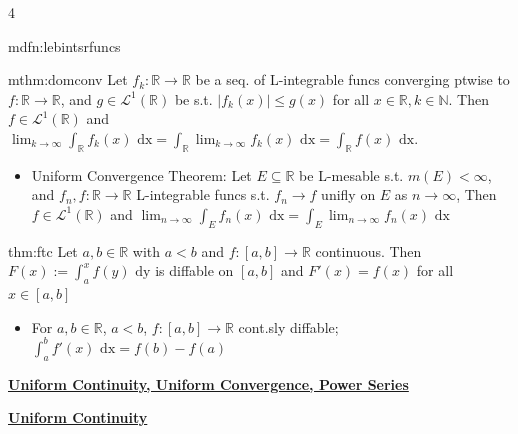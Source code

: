 \documentclass[landscape, 8pt]{extarticle}
\begin{document}
\begin{multicols*}{4}
\begin{mdfn-s}{mdfn:lebintsrfuncs}{ }
		\end{mdfn-s}
		
		
		\begin{mthm}{mthm:domconv}{ }
			Let $f_k : \mathbb{R} \to \mathbb{R}$ be a seq. of L-integrable funcs converging ptwise to $f: \mathbb{R} \to \mathbb{R}$, and $g\in \mathcal{L}^1(\mathbb{R})$ be s.t. $\left|f_k(x)\right| \le g(x)$ for all $x\in \mathbb{R}, k\in \mathbb{N}$. Then $f\in \mathcal{L}^1(\mathbb{R})$ and $\lim_{k\to \infty}\int_{\mathbb{R}}f_k(x) \text{ dx} = \int_{\mathbb{R}}\lim_{k\to \infty}f_k(x) \text{ dx} = \int_{\mathbb{R}}f(x) \text{ dx}$.
			\begin{itemize}
				\item Uniform Convergence Theorem: Let $E \subseteq \mathbb{R}$ be L-mesable s.t. $m(E) < \infty$, and $f_n, f : \mathbb{R} \to \mathbb{R}$ L-integrable funcs s.t. $f_n \to f$ unifly on $E$ as $n \to \infty$, Then $f\in \mathcal{L}^1(\mathbb{R})$ and $\lim_{n\to \infty} \int_E f_n(x) \text{ dx} = \int_E \lim_{n\to \infty} f_n (x) \text{ dx}$
			\end{itemize}
			
		\end{mthm}
		
		
		\begin{thm}{thm:ftc}{ }
			Let $a, b\in \mathbb{R}$ with $a < b$ and $f:[a, b] \to \mathbb{R}$ continuous. Then $F(x) := \int_{a}^{x}f(y) \text{ dy}$ is diffable on $[a, b]$ and $F'(x) = f(x)$ for all $x\in [a, b]$
			\begin{itemize}
				\item For $a, b\in \mathbb{R}$, $a < b$, $f: [a, b] \to \mathbb{R}$ cont.sly diffable; $\int_{a}^{b}f'(x) \text{ dx} = f(b) - f(a)$
			\end{itemize}
			
		\end{thm}		
		
		
		
		\columnbreak
		\vspace*{-8pt}
		
		
		{\footnotesize \textbf{\underline{Uniform Continuity, Uniform Convergence, Power Series}}}
		
		
		{\tiny\textbf{\underline{Uniform Continuity}}}
		

\end{multicols*}
\end{document}
